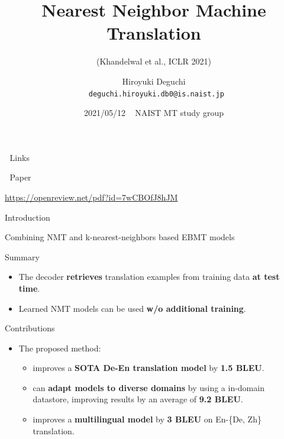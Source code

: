 \documentclass[unicode, 12pt, xdvipdfmx, aspectratio=169]{beamer}
\author{Hiroyuki Deguchi \\ \lower2.0pt\hbox{\materials} \texttt{deguchi.hiroyuki.db0@is.naist.jp}}
\date{2021/05/12 ~ NAIST MT study group}
\title{Nearest Neighbor Machine Translation}
\subtitle{(Khandelwal et al., ICLR 2021)}
\institute{}
\begin{document}
\maketitle

\begin{frame}[label={sec:orgde1a993}]{\hbox{\octicons} Links}
\begin{block}{\hbox{\octicons} Paper}
\begin{block}{\url{https://openreview.net/pdf?id=7wCBOfJ8hJM}}
\end{block}
\end{block}
\end{frame}
\begin{frame}[label={sec:orgd71be14}]{Introduction}
\begin{block}{Combining NMT and k-nearest-neighbors based EBMT models}
\begin{block}{Summary}
\begin{itemize}
\item The decoder \textbf{retrieves} translation examples from training data \textbf{at test time}.
\item Learned NMT models can be used \textbf{w/o additional training}.
\end{itemize}
\end{block}

\begin{block}{Contributions}
\begin{itemize}
\item The proposed method:
\begin{itemize}
\item improves a \textbf{SOTA De-En translation model} by \textbf{1.5 BLEU}.
\item can \textbf{adapt models to diverse domains} by using a in-domain datastore, improving results by an average of \textbf{9.2 BLEU}.
\item improves a \textbf{multilingual model} by \textbf{3 BLEU} on En-\{De, Zh\} translation.
\end{itemize}
\end{itemize}
\end{block}
\end{block}
\end{frame}
\end{document}
